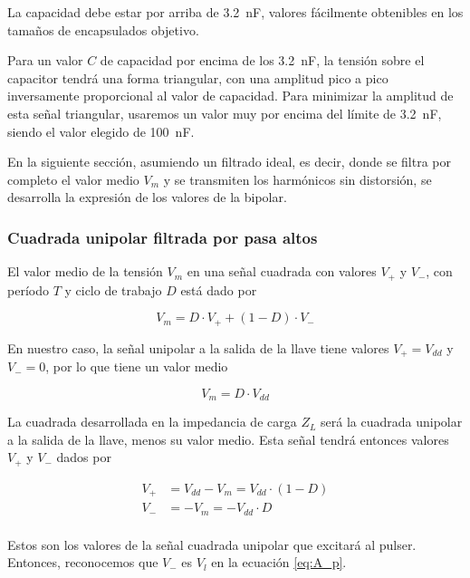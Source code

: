 La capacidad debe estar por arriba de \qty{3.2}{\nano\farad}, valores fácilmente
obtenibles en los tamaños de encapsulados objetivo.

Para un valor $C$ de capacidad por encima de los \qty{3.2}{\nano\farad}, la tensión sobre el capacitor tendrá una forma triangular, con una amplitud pico a pico inversamente proporcional al valor de capacidad. Para minimizar la amplitud de esta señal triangular, usaremos un valor muy por encima del límite de \qty{3.2}{\nano\farad}, siendo el valor elegido de \qty{100}{\nano\farad}.

En la siguiente sección, asumiendo un filtrado ideal, es decir, donde se filtra
por completo el valor medio $V_m$ y se transmiten los harmónicos sin distorsión,
se desarrolla la expresión de los valores de la bipolar.

\subsubsection{Cuadrada unipolar filtrada por pasa altos}

El valor medio de la tensión $V_m$ en una señal cuadrada con valores $V_+$ y
$V_-$, con período $T$ y ciclo de trabajo $D$ está dado por

\begin{equation}
    V_m = D \cdot V_+ + (1-D) \cdot V_-
\end{equation}

En nuestro caso, la señal unipolar a la salida de la llave tiene valores
$V_+=V_{dd}$ y $V_-=0$, por lo que tiene un valor medio

\begin{equation}
    V_m = D \cdot V_{dd}
\end{equation}

La cuadrada desarrollada en la impedancia de carga $Z_L$ será la cuadrada
unipolar a la salida de la llave, menos su valor medio. Esta señal tendrá
entonces valores $V_+$ y $V_-$ dados por

\begin{equation}
    \label{eq:square_linear_load_highpassed_values}
    \begin{aligned}
        V_+ &= V_{dd}-V_m = V_{dd} \cdot (1-D) \\
        V_- &= -V_m = -V_{dd} \cdot D \\
    \end{aligned}
\end{equation}

Estos son los valores de la señal cuadrada unipolar que excitará al pulser.
Entonces, reconocemos que $V_-$ es $V_l$ en la ecuación \ref{eq:A_p}.

